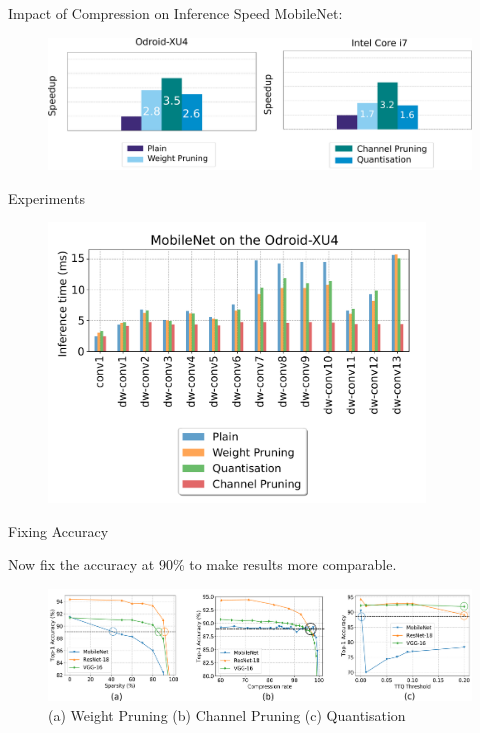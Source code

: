 \documentclass[xcolor=dvipsnames]{beamer}
\begin{document}
\begin{frame}{Impact of Compression on Inference Speed}
MobileNet:
\begin{figure}
    \centering
    \includegraphics[width=\linewidth]{images/mobilenet_speedup.pdf}
\end{figure}
\end{frame}







\begin{frame}{Experiments}
    
    \begin{figure}
        \centering
        \includegraphics[width=10cm]{images/mobilenet-odroid.pdf}
    \end{figure}
    
\end{frame}


\begin{frame}{Fixing Accuracy}
    
    Now fix the accuracy at 90\% to make results more comparable.
    
    \begin{figure}
        \centering
        \includegraphics[width=\linewidth]{images/accuracy.pdf}
        \caption{(a) Weight Pruning (b) Channel Pruning (c) Quantisation}
    \end{figure}
    
\end{frame}
\end{document}
